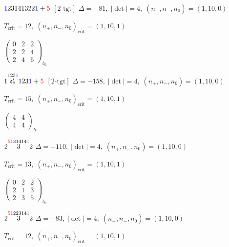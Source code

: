 \documentclass[10pt]{article}
\begin{document}
$\textcolor{blue}{1}23141322\textcolor{blue}{1}+\textcolor{red}{5}$ $\scriptstyle [2\text{-tgt}]$ \quad $\Delta=-81,\; |\det|=4,\; (n_+,n_-,n_0)=(1,10,0)$

\hspace{1em}$T_{\text{crit}}=12,\; (n_+,n_-,n_0)_{\text{crit}}=(1,10,1)$

\hspace{2em}$\left(\begin{smallmatrix}0 & 2 & 2 \\ 2 & 2 & 4 \\ 2 & 4 & 6\end{smallmatrix}\right)_{\!b_0}$

\smallskip

$1\overset{123\textcolor{blue}{1}}{\mathfrak{e}_7'}123\textcolor{blue}{1}+\textcolor{red}{5}$ $\scriptstyle [2\text{-tgt}]$ \quad $\Delta=-158,\; |\det|=4,\; (n_+,n_-,n_0)=(1,10,0)$

\hspace{1em}$T_{\text{crit}}=15,\; (n_+,n_-,n_0)_{\text{crit}}=(1,10,1)$

\hspace{2em}$\left(\begin{smallmatrix}4 & 4 \\ 4 & 4\end{smallmatrix}\right)_{\!b_0}$

\smallskip

$2\overset{\textcolor{red}{5}1314141}{3}2$ \quad $\Delta=-110,\; |\det|=4,\; (n_+,n_-,n_0)=(1,10,0)$

\hspace{1em}$T_{\text{crit}}=13,\; (n_+,n_-,n_0)_{\text{crit}}=(1,10,1)$

\hspace{2em}$\left(\begin{smallmatrix}0 & 2 & 2 \\ 2 & 1 & 3 \\ 2 & 3 & 5\end{smallmatrix}\right)_{\!b_0}$

\smallskip

$2\overset{\textcolor{red}{5}1223141}{3}2$ \quad $\Delta=-83,\; |\det|=4,\; (n_+,n_-,n_0)=(1,10,0)$

\hspace{1em}$T_{\text{crit}}=12,\; (n_+,n_-,n_0)_{\text{crit}}=(1,10,1)$
\end{document}
